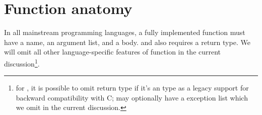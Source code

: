 \section{Function anatomy}\label{sec:functionAnatomy}

In all mainstream programming languages, a fully implemented function must have a name, an argument
list, and a body.
\java and \cpp also requires a return type.
We will omit all other language-specific features of function in the current
discussion\footnote{for \cpp, it is possible to omit return type
if it's an  type as a legacy support for backward compatibility with C;
\java may optionally have a  exception list which we omit in the current discussion.}.

%

